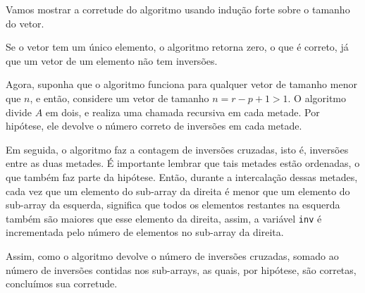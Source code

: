 \documentclass[a4paper]{article}
\begin{document}
Vamos mostrar a corretude do algoritmo usando indução forte sobre o tamanho do vetor.

Se o vetor tem um único elemento, o algoritmo retorna zero, o que é correto, já que um vetor de um elemento não tem inversões.

Agora, suponha que o algoritmo funciona para qualquer vetor de tamanho menor que $n$, e então, considere um vetor de tamanho $n = r-p+1 > 1$. O algoritmo divide $A$ em dois, e realiza uma chamada recursiva em cada metade. Por hipótese, ele devolve o número correto de inversões em cada metade.

Em seguida, o algoritmo faz a contagem de inversões cruzadas, isto é, inversões entre as duas metades. É importante lembrar que tais metades estão ordenadas, o que também faz parte da hipótese. Então, durante a intercalação dessas metades, cada vez que um elemento do sub-array da direita é menor que um elemento do sub-array da esquerda, significa que todos os elementos restantes na esquerda também são maiores que esse elemento da direita, assim, a variável \texttt{inv} é incrementada pelo número de elementos no sub-array da direita.

Assim, como o algoritmo devolve o número de inversões cruzadas, somado ao número de inversões contidas nos sub-arrays, as quais, por hipótese, são corretas, concluímos sua corretude.
\end{document}
